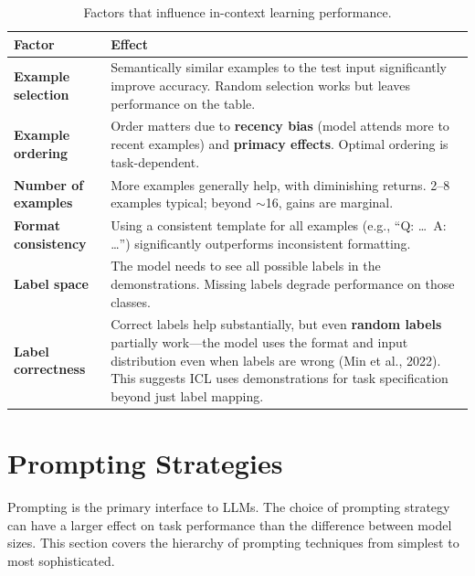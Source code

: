 \begin{table}[H]
\centering
\small
\begin{tabularx}{\textwidth}{@{}l X@{}}
\toprule
\textbf{Factor} & \textbf{Effect} \\
\midrule
\textbf{Example selection} & Semantically similar examples to the test input
  significantly improve accuracy.  Random selection works but leaves
  performance on the table. \\
\textbf{Example ordering} & Order matters due to \textbf{recency bias}
  (model attends more to recent examples) and \textbf{primacy effects}.
  Optimal ordering is task-dependent. \\
\textbf{Number of examples} & More examples generally help, with diminishing
  returns.  2--8 examples typical; beyond $\sim$16, gains are marginal. \\
\textbf{Format consistency} & Using a consistent template for all examples
  (e.g., ``Q: \ldots\ A: \ldots'') significantly outperforms inconsistent
  formatting. \\
\textbf{Label space} & The model needs to see all possible labels in the
  demonstrations.  Missing labels degrade performance on those classes. \\
\textbf{Label correctness} & Correct labels help substantially, but even
  \textbf{random labels} partially work---the model uses the format and
  input distribution even when labels are wrong (Min et al., 2022).  This
  suggests ICL uses demonstrations for task specification beyond just
  label mapping. \\
\bottomrule
\end{tabularx}
\caption{Factors that influence in-context learning performance.}
\label{tab:icl_factors}
\end{table}


\section{Prompting Strategies}
\label{sec:prompting}

Prompting is the primary interface to LLMs.  The choice of prompting strategy
can have a larger effect on task performance than the difference between model
sizes.  This section covers the hierarchy of prompting techniques from
simplest to most sophisticated.

